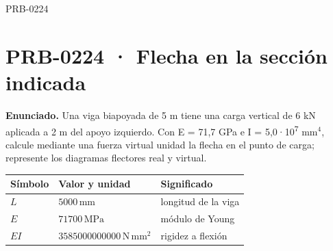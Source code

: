 \begin{studiumworked}{PRB-0224}

\section{PRB-0224 · Flecha en la sección indicada}

\textbf{Enunciado.} Una viga biapoyada de 5 m tiene una carga vertical de 6 kN aplicada a 2 m del apoyo izquierdo. Con E = 71,7 GPa e I = 5,0·10\textsuperscript{7} mm$^4$, calcule mediante una fuerza virtual unidad la flecha en el punto de carga; represente los diagramas flectores real y virtual.

\par\medskip\noindent\begin{tabular}{@{}p{.18\linewidth}p{.26\linewidth}p{.48\linewidth}@{}}
\toprule Símbolo & Valor y unidad & Significado\\\midrule
$L$ & $5000\,\mathrm{mm}$ & longitud de la viga\\
$E$ & $71700\,\mathrm{MPa}$ & módulo de Young\\
$EI$ & $3585000000000\,\mathrm{N\,mm^2}$ & rigidez a flexión\\
\bottomrule\end{tabular}\par\medskip


\end{studiumworked}
